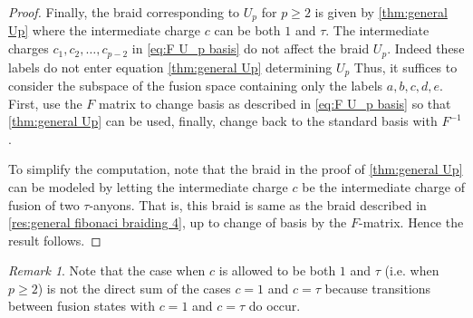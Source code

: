 \documentclass[a4paper,10pt,oneside]{book}
\theoremstyle{plain}
\theoremstyle{definition}
\theoremstyle{remark}
\newtheorem{remark}{Remark}[section]
\begin{document}
\begin{proof}
  Finally, the braid corresponding to $U_p$ for $p \ge 2$ is given by \cref{thm:general Up} where the intermediate charge $c$ can be both $1$ and $τ$. The intermediate charges $c_1, c_2, \ldots, c_{p-2}$ in \cref{eq:F U_p basis} do not affect the braid $U_p$. Indeed these labels do not enter equation \cref{thm:general Up} determining $U_p$ Thus, it suffices to consider the subspace of the fusion space containing only the labels $a,b,c,d,e$. First, use the $F$ matrix to change basis as described in \cref{eq:F U_p basis} so that \cref{thm:general Up} can be used, finally, change back to the standard basis with $F^{-1}$.

  To simplify the computation, note that the braid in the proof of \cref{thm:general Up} can be modeled by letting the intermediate charge $c$ be the intermediate charge of fusion of two $τ$-anyons. That is, this braid is same as the braid described in \cref{res:general fibonaci braiding 4}, up to change of basis by the $F$-matrix. Hence the result follows.
\end{proof}

\begin{remark}
  Note that the case when $c$ is allowed to be both $1$ and $τ$ (i.e. when $p \ge 2$) is not the direct sum of the cases $c=1$ and $c=τ$ because transitions between fusion states with $c=1$ and $c=τ$ do occur.
\end{remark}
\end{document}
